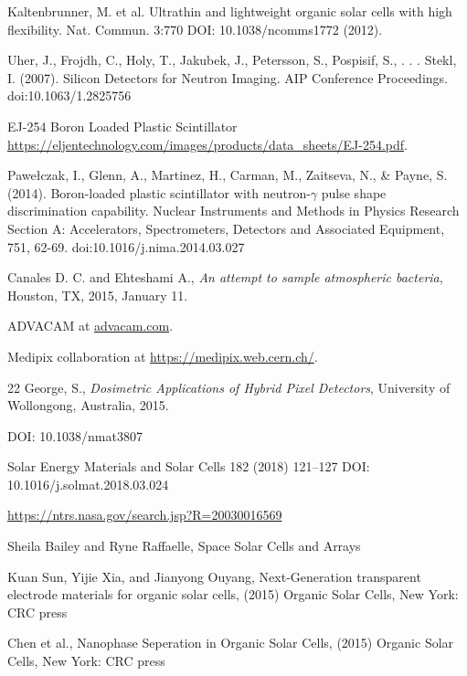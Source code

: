 \begin{thebibliography}{9}
  Kaltenbrunner, M. et al. Ultrathin and lightweight organic solar cells with high flexibility. Nat. Commun. 3:770 DOI: 10.1038/ncomms1772 (2012).

  Uher, J., Frojdh, C., Holy, T., Jakubek, J., Petersson, S., Pospisif, S., . . . Stekl, I. (2007). Silicon Detectors for Neutron Imaging. AIP Conference Proceedings. doi:10.1063/1.2825756

  EJ-254 Boron Loaded Plastic Scintillator \url{https://eljentechnology.com/images/products/data_sheets/EJ-254.pdf}.

  Pawełczak, I., Glenn, A., Martinez, H., Carman, M., Zaitseva, N., \& Payne, S. (2014). Boron-loaded plastic scintillator with neutron-$\gamma$ pulse shape discrimination capability. Nuclear Instruments and Methods in Physics Research Section A: Accelerators, Spectrometers, Detectors and Associated Equipment, 751, 62-69. doi:10.1016/j.nima.2014.03.027
  
 Canales D. C. and Ehteshami A., \textit{An attempt to sample atmospheric bacteria}, Houston, TX, 2015, January 11.

  ADVACAM at \url{advacam.com}.

  Medipix collaboration at \url{https://medipix.web.cern.ch/}.
  
 22
  George, S., \textit{Dosimetric Applications of Hybrid Pixel Detectors}, University of Wollongong, Australia, 2015.
  
  DOI: 10.1038/nmat3807 
  
  Solar Energy Materials and Solar Cells 182 (2018) 121–127
DOI: 10.1016/j.solmat.2018.03.024

\url{https://ntrs.nasa.gov/search.jsp?R=20030016569}

Sheila Bailey and Ryne Raffaelle, Space Solar Cells and Arrays

Kuan Sun, Yijie Xia, and Jianyong Ouyang, Next-Generation transparent electrode materials for organic solar cells, (2015) Organic Solar Cells, New York: CRC press

Chen et al., Nanophase Seperation in Organic Solar Cells, (2015) Organic Solar Cells, New York: CRC press




\end{thebibliography}
